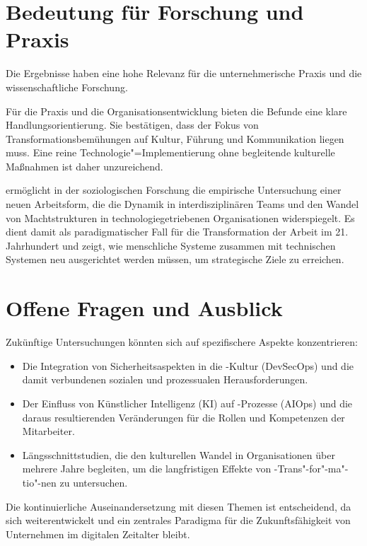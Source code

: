 \section{Bedeutung für Forschung und Praxis}
Die Ergebnisse haben eine hohe Relevanz für die unternehmerische Praxis und die wissenschaftliche Forschung.

Für die Praxis und die Organisationsentwicklung bieten die Befunde eine klare Handlungsorientierung.
Sie bestätigen, dass der Fokus von Transformationsbemühungen auf Kultur, Führung und Kommunikation liegen muss.
Eine reine Technologie"=Implementierung ohne begleitende kulturelle Maßnahmen ist daher unzureichend.

\DO ermöglicht in der soziologischen Forschung die empirische Untersuchung einer neuen Arbeitsform, die die Dynamik in interdisziplinären Teams und den Wandel von Machtstrukturen in technologiegetriebenen Organisationen widerspiegelt.
Es dient damit als paradigmatischer Fall für die Transformation der Arbeit im 21. Jahrhundert und zeigt, wie menschliche Systeme zusammen mit technischen Systemen neu ausgerichtet werden müssen, um strategische Ziele zu erreichen.

\section{Offene Fragen und Ausblick}
Zukünftige Untersuchungen könnten sich auf spezifischere Aspekte konzentrieren:
\begin{itemize}
	\item Die Integration von Sicherheitsaspekten in die \DO-Kultur (Dev\-Sec\-Ops) und die damit verbundenen sozialen und prozessualen Herausforderungen.
	\item Der Einfluss von Künstlicher Intelligenz (KI) auf \DO-Prozesse (AI\-Ops) und die daraus resultierenden Veränderungen für die Rollen und Kompetenzen der Mitarbeiter.
	\item Längsschnittstudien, die den kulturellen Wandel in Organisationen über mehrere Jahre begleiten, um die langfristigen Effekte von \DO-Trans"-for"-ma"-tio"-nen zu untersuchen.
\end{itemize}

Die kontinuierliche Auseinandersetzung mit diesen Themen ist entscheidend, da sich \DO weiterentwickelt und ein zentrales Paradigma für die Zukunftsfähigkeit von Unternehmen im digitalen Zeitalter bleibt.